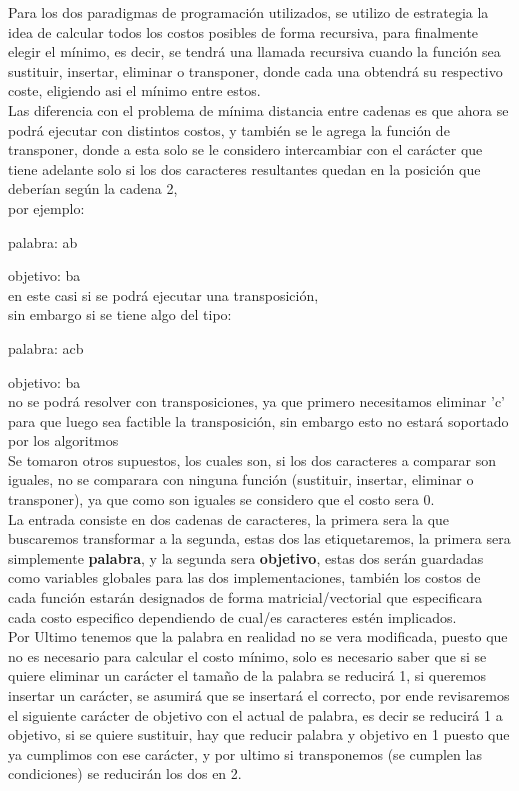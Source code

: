 Para los dos paradigmas de programación utilizados, se utilizo de estrategia la idea de calcular todos los costos posibles de forma recursiva, para finalmente elegir el mínimo, es decir, se tendrá una llamada recursiva cuando la función sea sustituir, insertar, eliminar o transponer, donde cada una obtendrá su respectivo coste, eligiendo asi el mínimo entre estos.\\
Las diferencia con el problema de mínima distancia entre cadenas es que ahora se podrá ejecutar con distintos costos, y también se le agrega la función de transponer, donde a esta solo se le considero intercambiar con el carácter que tiene adelante solo si los dos caracteres resultantes quedan en la posición que deberían según la cadena 2, \\por ejemplo:

palabra: ab

objetivo: ba\\ 
en este casi si se podrá ejecutar una transposición, \\sin embargo si se tiene algo del tipo:

palabra: acb

objetivo: ba\\ 
no se podrá resolver con transposiciones, ya que primero necesitamos eliminar 'c' para que luego sea factible la transposición, sin embargo esto no estará soportado por los algoritmos\\
Se tomaron otros supuestos, los cuales son, si los dos caracteres a comparar son iguales, no se comparara con ninguna función (sustituir, insertar, eliminar o transponer), ya que como son iguales se considero que el costo sera 0.
\\ 
La entrada consiste en dos cadenas de caracteres, la primera sera la que buscaremos transformar a la segunda, estas dos las etiquetaremos, la primera sera simplemente \textbf{palabra}, y la segunda sera \textbf{objetivo}, estas dos serán guardadas como variables globales para las dos implementaciones, también los costos de cada función estarán designados de forma matricial/vectorial que especificara cada costo especifico dependiendo de cual/es caracteres estén implicados.
\\
Por Ultimo tenemos que la palabra en realidad no se vera modificada, puesto que no es necesario para calcular el costo mínimo, solo es necesario saber que si se quiere eliminar un carácter el tamaño de la palabra se reducirá 1, si queremos insertar un carácter, se asumirá que se insertará el correcto, por ende revisaremos el siguiente carácter de objetivo con el actual de palabra, es decir se reducirá 1 a objetivo, si se quiere sustituir, hay que reducir palabra y objetivo en 1 puesto que ya cumplimos con ese carácter, y por ultimo si transponemos (se cumplen las condiciones) se reducirán los dos en 2.


